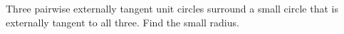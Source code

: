 Three pairwise externally tangent unit circles surround a small circle that is externally tangent to all three. Find the small radius.
